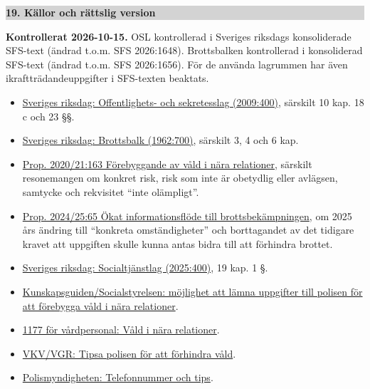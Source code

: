 \documentclass[10pt,a4paper]{article}
\newcommand{\sectionbar}[1]{%
  \par\smallskip\noindent
  \colorbox{lightgray}{\parbox{0.965\linewidth}{\bfseries #1}}%
  \par\smallskip
}
\begin{document}
\sectionbar{19. Källor och rättslig version}

\scriptsize
\textbf{Kontrollerat 2026-10-15.} OSL kontrollerad i Sveriges riksdags konsoliderade SFS-text (ändrad t.o.m. SFS 2026:1648). Brottsbalken kontrollerad i konsoliderad SFS-text (ändrad t.o.m. SFS 2026:1656). För de använda lagrummen har även ikraftträdandeuppgifter i SFS-texten beaktats.

\begin{itemize}
\item \href{https://www.riksdagen.se/sv/dokument-och-lagar/dokument/svensk-forfattningssamling/offentlighets-och-sekretesslag-2009400_sfs-2009-400/}{Sveriges riksdag: Offentlighets- och sekretesslag (2009:400)}, särskilt 10 kap. 18 c och 23 \S\S.
\item \href{https://www.riksdagen.se/sv/dokument-och-lagar/dokument/svensk-forfattningssamling/brottsbalk-1962700_sfs-1962-700/}{Sveriges riksdag: Brottsbalk (1962:700)}, särskilt 3, 4 och 6 kap.
\item \href{https://www.riksdagen.se/sv/dokument-och-lagar/dokument/proposition/forebyggande-av-vald-i-nara-relationer_h803163/html/}{Prop. 2020/21:163 Förebyggande av våld i nära relationer}, särskilt resonemangen om konkret risk, risk som inte är obetydlig eller avlägsen, samtycke och rekvisitet ``inte olämpligt''.
\item \href{https://www.riksdagen.se/sv/dokument-och-lagar/dokument/proposition/okat-informationsflode-till-brottsbekampningen_hc0365/html/}{Prop. 2024/25:65 Ökat informationsflöde till brottsbekämpningen}, om 2025 års ändring till ``konkreta omständigheter'' och borttagandet av det tidigare kravet att uppgiften skulle kunna antas bidra till att förhindra brottet.
\item \href{https://www.riksdagen.se/sv/dokument-och-lagar/dokument/svensk-forfattningssamling/socialtjanstlag-2025400_sfs-2025-400/}{Sveriges riksdag: Socialtjänstlag (2025:400)}, 19 kap. 1 \S.
\item \href{https://kunskapsguiden.se/omraden-och-teman/vald-och-fortryck/vald-i-nara-relationer/socialtjansten-och-vald-i-nara-relationer/valdsutovare-i-nara-relationer/mojlighet-att-lamna-uppgifter-till-polisen-for-att-forebygga-vald-i-nara-relationer/}{Kunskapsguiden/Socialstyrelsen: möjlighet att lämna uppgifter till polisen för att förebygga våld i nära relationer}.
\item \href{https://vardpersonal.1177.se/kunskapsstod/kliniska-kunskapsstod/vald-i-nara-relationer/}{1177 för vårdpersonal: Våld i nära relationer}.
\item \href{https://www.vgregion.se/f/regionhalsan/valdinararelationer/vardens_uppgifter/tipsa-polisen/}{VKV/VGR: Tipsa polisen för att förhindra våld}.
\item \href{https://polisen.se/om-polisen/kontakt/polisens-telefonnummer/}{Polismyndigheten: Telefonnummer och tips}.
\end{itemize}
\end{document}
